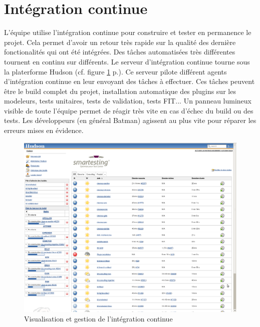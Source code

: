 \section{Intégration continue}
L'équipe utilise l'intégration continue pour construire et tester en permanence le projet. Cela permet d'avoir un retour très rapide sur la qualité des dernière fonctionalités qui ont été intégrées. Des tâches automatisées très différentes tournent en continu sur différents. Le serveur d'intégration continue tourne sous la platerforme Hudson (cf. figure \ref{figure:hudson} p.\pageref{figure:hudson}). Ce serveur pilote différent agents d'intégration continue en leur envoyant des tâches à effectuer. Ces tâches peuvent être le build complet du projet, installation automatique des plugins sur les modeleurs, tests unitaires, tests de validation, tests FIT... Un panneau lumineux visible de toute l'équipe permet de réagir très vite en cas d'échec du build ou des tests. Les développeurs (en général Batman) agissent au plus vite pour réparer les erreurs mises en évidence.

\begin{figure}[!ht]
\centering
\includegraphics[width=\textwidth]{Illustrations/hudson.png}
\caption{Visualisation et gestion de l'intégration continue}
\label{figure:hudson}
\end{figure}

